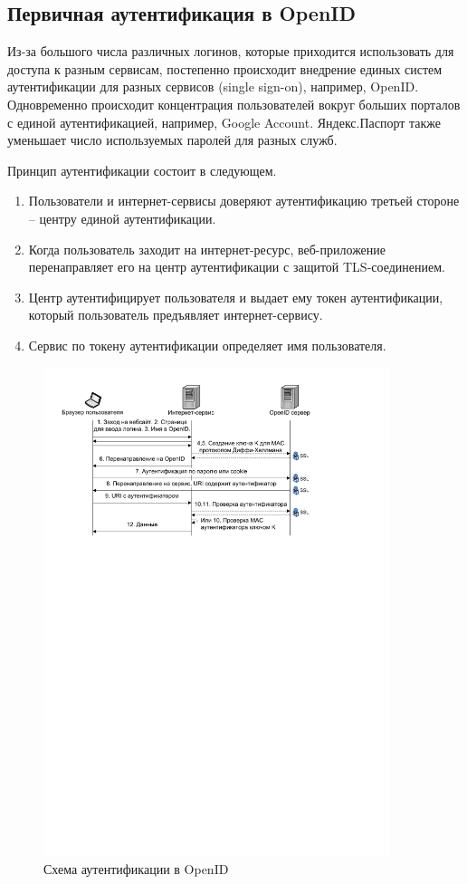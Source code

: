 \subsection{Первичная аутентификация в OpenID}

Из-за большого числа различных логинов, которые приходится использовать для доступа к разным сервисам, постепенно происходит внедрение единых систем аутентификации для разных сервисов (single sign-on), например, OpenID. Одновременно происходит концентрация пользователей вокруг больших порталов с единой аутентификацией, например, Google Account. Яндекс.Паспорт также уменьшает число используемых паролей для разных служб.

Принцип аутентификации состоит в следующем.
\begin{enumerate}
    \item Пользователи и интернет-сервисы доверяют аутентификацию третьей стороне -- центру единой аутентификации.
    \item Когда пользователь заходит на интернет-ресурс, веб-приложение перенаправляет его на центр аутентификации с защитой TLS-соединением.
    \item Центр аутентифицирует пользователя и выдает ему токен аутентификации, который пользователь предъявляет интернет-сервису.
    \item Сервис по токену аутентификации определяет имя пользователя.
\end{enumerate}

\begin{figure}[!ht]
	\centering
	\includegraphics[width=0.9\textwidth]{pic/openid}
	\caption{Схема аутентификации в OpenID\label{fig:openid}}
\end{figure}

